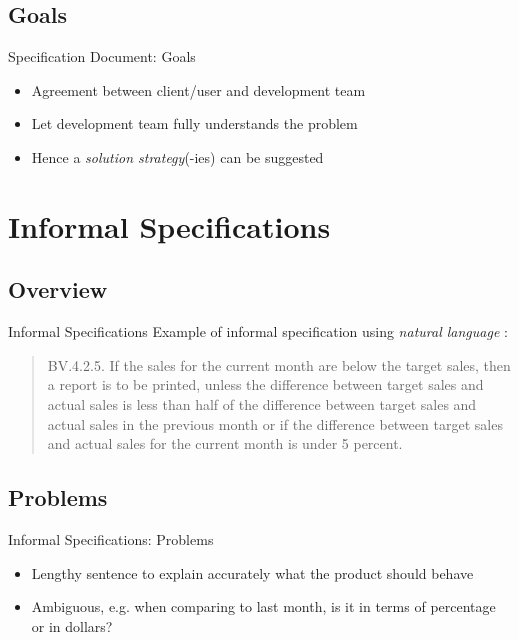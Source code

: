 \documentclass{beamer}
\begin{document}
	\subsection{Goals}
	\begin{frame}{Specification Document: Goals}
		\begin{itemize}
			\item Agreement between client/user and development team
			\item Let development team fully understands the problem
			\item Hence a \textit{solution strategy}(-ies) can be suggested
		\end{itemize}
	\end{frame}

	\section{Informal Specifications}
	\subsection{Overview}
	\begin{frame}{Informal Specifications}
		Example of informal specification using \textit{natural language} \cite[page 462]{Schach:2006:OCS:1207045}:
		\begin{quotation}
		BV.4.2.5. If the sales for the current month are below the target sales, then a report is to be printed, unless the difference between target sales and actual sales is less than half of the difference between target sales and actual sales in the previous month or if the difference between target sales and actual sales for the current month is under 5 percent.
	\end{quotation}
	\end{frame}
	\subsection{Problems}
	\begin{frame}{Informal Specifications: Problems}
		\begin{itemize}
			\item Lengthy sentence to explain accurately what the product should behave
			\item Ambiguous, e.g. when comparing to last month, is it in terms of percentage or in dollars?
		\end{itemize}
	\end{frame}	
\end{document}
